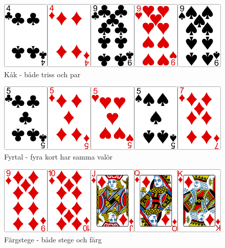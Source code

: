 \begin{figure}[H]
 \begin{minipage}[c]{0.5\textwidth}
  \includegraphics[width=\textwidth]{../img/w05-hands/fullhouse.png}
 \end{minipage}
 \begin{minipage}[c]{0.3\textwidth}
  \caption{Kåk - både triss och par}
 \end{minipage}
\end{figure}

\begin{figure}[H]
 \begin{minipage}[c]{0.5\textwidth}
  \includegraphics[width=\textwidth]{../img/w05-hands/fours.png}
 \end{minipage}
 \begin{minipage}[c]{0.3\textwidth}
  \caption{Fyrtal - fyra kort har samma valör}
 \end{minipage}
\end{figure}

\begin{figure}[H]
 \begin{minipage}[c]{0.5\textwidth}
  \includegraphics[width=\textwidth]{../img/w05-hands/straightflush.png}
 \end{minipage}
 \begin{minipage}[c]{0.3\textwidth}
  \caption{Färgstege - både stege och färg}
 \end{minipage}
\end{figure}

